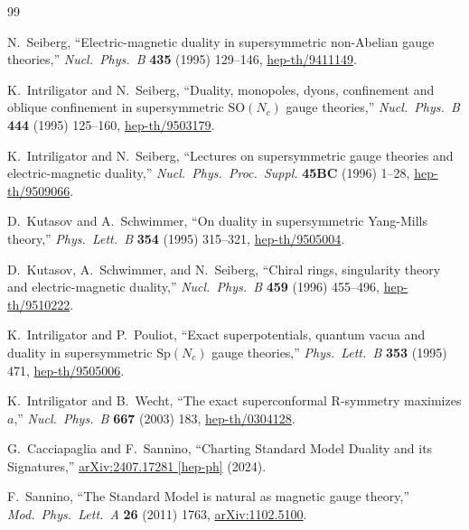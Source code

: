 \documentclass[11pt,a4paper]{article}
\theoremstyle{plain}
\theoremstyle{definition}
\theoremstyle{remark}
\newcommand{\Nc}{N_{\!c}}
\newcommand{\SO}[1]{\mathrm{SO}(#1)}
\begin{document}
\begin{thebibliography}{99}

N.~Seiberg,
``Electric-magnetic duality in supersymmetric non-Abelian gauge theories,''
\textit{Nucl.\ Phys.\ B} \textbf{435} (1995) 129--146,
\href{https://arxiv.org/abs/hep-th/9411149}{hep-th/9411149}.

K.~Intriligator and N.~Seiberg,
``Duality, monopoles, dyons, confinement and oblique confinement
in supersymmetric $\SO{\Nc}$ gauge theories,''
\textit{Nucl.\ Phys.\ B} \textbf{444} (1995) 125--160,
\href{https://arxiv.org/abs/hep-th/9503179}{hep-th/9503179}.

K.~Intriligator and N.~Seiberg,
``Lectures on supersymmetric gauge theories and electric-magnetic duality,''
\textit{Nucl.\ Phys.\ Proc.\ Suppl.} \textbf{45BC} (1996) 1--28,
\href{https://arxiv.org/abs/hep-th/9509066}{hep-th/9509066}.

D.~Kutasov and A.~Schwimmer,
``On duality in supersymmetric Yang-Mills theory,''
\textit{Phys.\ Lett.\ B} \textbf{354} (1995) 315--321,
\href{https://arxiv.org/abs/hep-th/9505004}{hep-th/9505004}.

D.~Kutasov, A.~Schwimmer, and N.~Seiberg,
``Chiral rings, singularity theory and electric-magnetic duality,''
\textit{Nucl.\ Phys.\ B} \textbf{459} (1996) 455--496,
\href{https://arxiv.org/abs/hep-th/9510222}{hep-th/9510222}.

K.~Intriligator and P.~Pouliot,
``Exact superpotentials, quantum vacua and duality in supersymmetric
$\mathrm{Sp}(N_c)$ gauge theories,''
\textit{Phys.\ Lett.\ B} \textbf{353} (1995) 471,
\href{https://arxiv.org/abs/hep-th/9505006}{hep-th/9505006}.

K.~Intriligator and B.~Wecht,
``The exact superconformal R-symmetry maximizes $a$,''
\textit{Nucl.\ Phys.\ B} \textbf{667} (2003) 183,
\href{https://arxiv.org/abs/hep-th/0304128}{hep-th/0304128}.

G.~Cacciapaglia and F.~Sannino,
``Charting Standard Model Duality and its Signatures,''
\href{https://arxiv.org/abs/2407.17281}{arXiv:2407.17281 [hep-ph]} (2024).

F.~Sannino,
``The Standard Model is natural as magnetic gauge theory,''
\textit{Mod.\ Phys.\ Lett.\ A} \textbf{26} (2011) 1763,
\href{https://arxiv.org/abs/1102.5100}{arXiv:1102.5100}.


\end{thebibliography}
\end{document}
